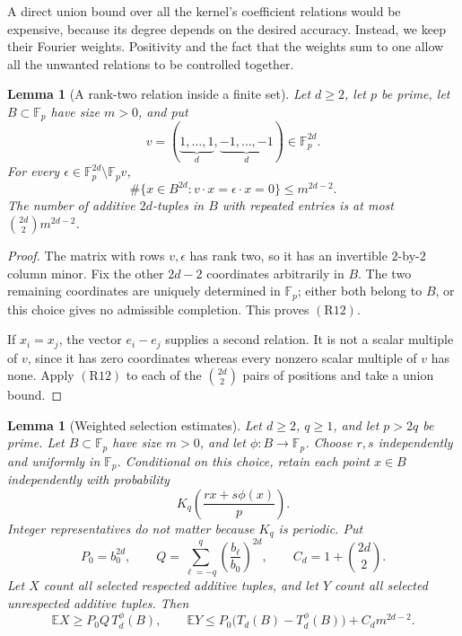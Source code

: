 \documentclass[11pt,letterpaper]{article}
\numberwithin{equation}{section}
\newtheorem{lemma}[theorem]{Lemma}
\theoremstyle{definition}
\theoremstyle{remark}
\newcommand{\E}{\mathbb E}
\newcommand{\F}{\mathbb F}
\newcommand{\1}{\mathbf 1}
\begin{document}
A direct union bound over all the kernel's coefficient relations
would be expensive, because its degree depends on the desired
accuracy.  Instead, we keep their Fourier weights.  Positivity
and the fact that the weights sum to one allow all the
unwanted relations to be controlled together.

\begin{lemma}[A rank-two relation inside a finite set]
\label{gsr:en:04:rest:exceptional}
Let \(d\geq2\), let \(p\) be prime, let
\(B\subset\F_p\) have size \(m>0\), and put
\[
 v=(\underbrace{1,\ldots,1}_{d},
      \underbrace{-1,\ldots,-1}_{d})\in\F_p^{2d}.
\]
For every \(\epsilon\in\F_p^{2d}\setminus\F_pv\),
\[
 \#\{x\in B^{2d}:v\cdot x=\epsilon\cdot x=0\}
       \leq m^{2d-2}.
 \tag{R12}
\]
The number of additive \(2d\)-tuples in \(B\) with repeated
entries is at most \(\binom{2d}{2}m^{2d-2}\).
\end{lemma}

\begin{proof}
The matrix with rows \(v,\epsilon\) has rank two, so it has
an invertible \(2\)-by-\(2\) column minor.  Fix the other
\(2d-2\) coordinates arbitrarily in \(B\).  The two remaining
coordinates are uniquely determined in \(\F_p\); either
both belong to \(B\), or this choice gives no admissible
completion.  This proves \(\mathrm{(R12)}\).

If \(x_i=x_j\), the vector \(e_i-e_j\) supplies a second
relation.  It is not a scalar multiple of \(v\), since it
has zero coordinates whereas every nonzero scalar multiple
of \(v\) has none.  Apply \(\mathrm{(R12)}\) to each of the
\(\binom{2d}{2}\) pairs of positions and take a union bound.
\end{proof}

\begin{lemma}[Weighted selection estimates]
\label{gsr:en:04:rest:survival}
Let \(d\geq2\), \(q\geq1\), and let \(p>2q\) be prime.
Let \(B\subset\F_p\) have size \(m>0\), and let
\(\phi:B\to\F_p\).  Choose \(r,s\) independently and uniformly
in \(\F_p\).  Conditional on this choice, retain each
point \(x\in B\) independently with probability
\[
 K_q\left(\frac{rx+s\phi(x)}p\right).
 \tag{R13}
\]
Integer representatives do not matter because \(K_q\) is
periodic.  Put
\[
 P_0=b_0^{2d},\qquad
 Q=\sum_{\ell=-q}^q
            \left(\frac{b_\ell}{b_0}\right)^{2d},
 \qquad
 C_d=1+\binom{2d}{2}.
 \tag{R14}
\]
Let \(X\) count all selected respected additive tuples,
and let \(Y\) count all selected unrespected additive
tuples.  Then
\[
 \E X\geq P_0Q\,T_d^\phi(B),
 \qquad
 \E Y\leq P_0\bigl(T_d(B)-T_d^\phi(B)\bigr)
                         +C_dm^{2d-2}.
 \tag{R15}
\]
\end{lemma}
\end{document}
